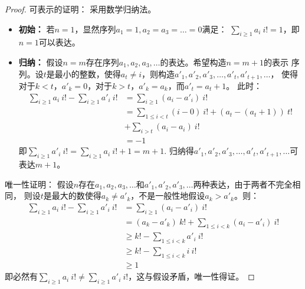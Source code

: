 \begin{proof}
    可表示的证明：
    采用数学归纳法。
    \begin{itemize}
        \item \textbf{初始：}
        若$n=1$，显然序列$a_1=1, a_2=a_3=\ldots=0$满足：
        $\sum_{i\ge 1} {a_i\ i!} = 1$，即$n=1$可以表达。
        \item \textbf{归纳：}
        假设$n=m$存在序列$a_1,a_2,a_3,\ldots$的表达。希望构造$n=m+1$的表示
        序列。设$t$是最小的整数，使得$a_t\neq i$，则构造$a'_1,a'_2,a'_3,\ldots,a'_t,a'_{t+1},\ldots$，
        使得对于$k<t$，$a'_k=0$，对于$k>t$，$a'_k=a_k$，而$a'_t=a_t+1$。
        此时：
        \begin{align*}
            \sum_{i\ge 1} {a_i\ i!}-\sum_{i\ge 1} {a'_i\ i!} &= \sum_{i\ge 1}{(a_i-a'_i)\ i!} \\
            &= \sum_{1\le i< t}{(i-0)\ i!} + (a_t - (a_t+1))\ t! \\&+ \sum_{i> t}{(a_i - a_i)\ i!}\\
            &= -1
        \end{align*}
        即$\sum_{i\ge 1} {a'_i\ i!}=\sum_{i\ge 1} {a_i\ i!}+1=m+1$.
        归纳得$a'_1,a'_2,a'_3,\ldots,a'_t,a'_{t+1},\ldots$可表达$m+1$。
    \end{itemize}

    唯一性证明：
    假设$n$存在$a_1,a_2,a_3,\ldots$和$a'_1,a'_2,a'_3,\ldots$两种表达，由于两者不完全相同，
    则设$t$是最大的数使得$a_k\neq a'_k$，不是一般性地假设$a_k> a'_k$。则：
    \begin{align*}
        \sum_{i\ge 1} {a_i\ i!}-\sum_{i\ge 1} {a'_i\ i!} &= \sum_{i\ge 1}{(a_i-a'_i)\ i!} \\
        &= (a_k-a'_k)\ k! + \sum_{1\le i< k}{(a_i - a'_i)\ i!}\\
        &\ge k! - \sum_{1\le i< k}{a'_i\ i!}\\
        &\ge k! - \sum_{1\le i< k}{i\ i!}\\
        &\ge 1
    \end{align*}
    即必然有$\sum_{i\ge 1} {a_i\ i!}\neq\sum_{i\ge 1} {a'_i\ i!}$，这与假设矛盾，唯一性得证。
\end{proof}